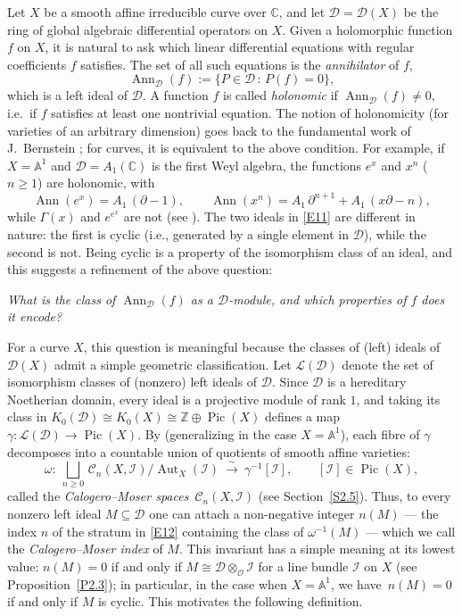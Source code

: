 \documentclass[11pt,reqno]{amsart}
\theoremstyle{plain}
\theoremstyle{definition}
\theoremstyle{remark}
\numberwithin{equation}{section}
\newcommand{\cD}{\mathcal{D}}
\newcommand{\cO}{\mathcal{O}}
\newcommand{\cC}{\mathcal{C}}
\newcommand{\cL}{\mathcal{L}}
\newcommand{\C}{\mathbb{C}}
\newcommand{\Z}{\mathbb{Z}}
\newcommand{\A}{\mathbb{A}}
\newcommand{\del}{\partial}
\DeclareMathOperator{\Ann}{Ann}
\DeclareMathOperator{\Pic}{Pic}
\DeclareMathOperator{\Aut}{Aut}
\begin{document}
Let $X$ be a smooth affine irreducible curve over $\C$, and let $\cD = \cD(X)$ be the ring of
global algebraic differential operators on $X$. Given a holomorphic function $f$ on $X$, it is natural to ask which linear differential equations with regular coefficients $f$ satisfies. The set of all such equations is the \emph{annihilator} of $f$,
\[
  \Ann_{\cD}(f) := \{ P \in \cD \,:\, P(f) = 0 \} ,
\]
which is a left ideal of $\cD$. A function $f$ is called \emph{holonomic} if
$\Ann_{\cD}(f) \ne 0$, i.e.\ if $f$ satisfies at least one nontrivial equation. The notion of
holonomicity (for varieties of an arbitrary dimension) goes back to the fundamental work of J.~Bernstein \cite{Bernstein}; for curves, it is equivalent to the above condition. For example, if $X = \A^1$ and $\cD = A_1(\C)$ is the first Weyl algebra, the
functions $e^x$ and $x^n$ ($n \ge 1$) are holonomic, with
\begin{equation}
\label{E11}
  \Ann(e^x) = A_1\,(\del - 1) , \qquad \Ann(x^n) = A_1\,\del^{n+1} + A_1\,(x\del - n) ,
\end{equation}
while $\Gamma(x)$ and $e^{e^x}$ are not (see \cite[Chapter 5, Section~3]{Coutinho1995}). The two ideals in
\eqref{E11} are different in nature: the first is cyclic (i.e., generated by a single element in 
$\cD$), while the second is not. Being cyclic
is a property of the isomorphism class of an ideal, and this suggests a refinement of the above
question: 
\begin{center}
\emph{What is the class of $\Ann_{\cD}(f)$ as a $\cD$-module, and which
properties of $f$ does it encode?}
\end{center}
For a curve $X$, this question is meaningful because the classes of (left) ideals of
$\cD(X)$ admit a simple geometric classification. Let $\cL(\cD)$ denote the set of isomorphism classes
of (nonzero) left ideals of $\cD$. Since $\cD$ is a hereditary Noetherian domain, every ideal is
a projective module of rank $1$, and taking its class in $K_0(\cD) \cong K_0(X) \cong \Z \oplus
\Pic(X)$ defines a map $\gamma: \cL(\cD) \to \Pic(X)$. By \cite{BerestChalykhIdeals}
(generalizing \cite{BerestWilson00, BerestWilsonNC} in the case $X = \A^1$), each fibre of
$\gamma$ decomposes into a countable union of quotients of smooth affine varieties:
\begin{equation}
\label{E12}
  \omega : \ \bigsqcup_{n \ge 0}\,\cC_n(X, \mathcal{I})/\!\Aut_X({\mathcal I})
           \ \stackrel{\sim}{\longrightarrow}\ \gamma^{-1}[\mathcal{I}] ,
           \qquad [\mathcal{I}] \in \Pic(X) ,
\end{equation}
called the \emph{Calogero--Moser spaces} $\,
\cC_{n}(X, \mathcal{I})$ (see Section~\ref{S2.5}). Thus, to every nonzero left ideal
$M \subseteq \cD$ one can attach a non-negative integer $n(M)$ --- the index $n$ of the stratum
in \eqref{E12} containing the class of $\omega^{-1}(M)$ --- which we call the \emph{Calogero--Moser index} of
$M$. This invariant has a simple meaning at its lowest value: $n(M) = 0$ if and only if
$M \cong \cD \otimes_{\cO} \mathcal{I}$ for a line bundle $\mathcal{I}$ on $X$ (see
Proposition~\ref{P2.3}); in particular, in the case when $X = \A^1$, we have $\,n(M) = 0$ if and only if $M$ is cyclic. This motivates the following definition.
\end{document}
